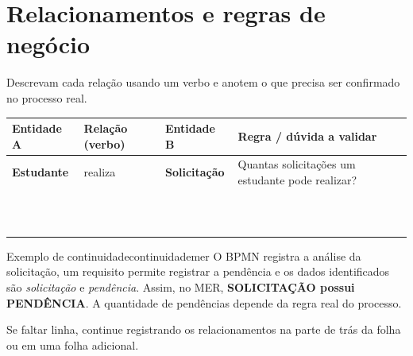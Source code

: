 \section{Relacionamentos e regras de negócio}

Descrevam cada relação usando um verbo e anotem o que precisa ser confirmado no processo real.

\begin{table}[!ht]
\centering
\small
\setlength{\tabcolsep}{4pt}
\renewcommand{\arraystretch}{1.75}
\begin{tabularx}{\linewidth}{|>{\raggedright\arraybackslash}X
                              |>{\centering\arraybackslash}X
                              |>{\raggedright\arraybackslash}X
                              |>{\raggedright\arraybackslash}X|}
\hline
\textbf{Entidade A} &
\textbf{Relação (verbo)} &
\textbf{Entidade B} &
\textbf{Regra / dúvida a validar} \\
\hline
\textbf{Estudante} & realiza & \textbf{Solicitação} &
Quantas solicitações um estudante pode realizar? \\
\hline
 & & & \\ \hline
 & & & \\ \hline
 & & & \\ \hline
 & & & \\ \hline
 & & & \\ \hline
 & & & \\ \hline
 & & & \\ \hline
 & & & \\ \hline
 & & & \\ \hline
 & & & \\ \hline
 & & & \\ \hline
\end{tabularx}
\end{table}

\begin{example}{Exemplo de continuidade}{continuidademer}
O BPMN registra a análise da solicitação, um requisito permite registrar a pendência
e os dados identificados são \emph{solicitação} e \emph{pendência}. Assim, no MER,
\textbf{SOLICITAÇÃO possui PENDÊNCIA}. A quantidade de pendências depende da regra real do processo.
\end{example}

\begin{warnbox}[Observação]
Se faltar linha, continue registrando os relacionamentos na parte de trás da folha ou em uma folha adicional.
\end{warnbox}
